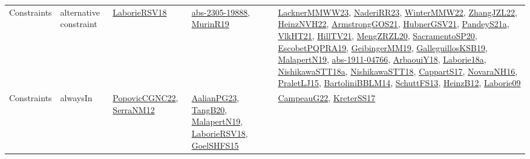 {\begin{longtable}{lp{3cm}>{\raggedright}p{6cm}>{\raggedright}p{6cm}p{8cm}}
Constraints & alternative constraint & \href{articles/LaborieRSV18.pdf}{LaborieRSV18}\cite{LaborieRSV18} & \href{articles/abs-2305-19888.pdf}{abs-2305-19888}\cite{abs-2305-19888}, \href{papers/MurinR19.pdf}{MurinR19}\cite{MurinR19} & \href{articles/LacknerMMWW23.pdf}{LacknerMMWW23}\cite{LacknerMMWW23}, \href{articles/NaderiRR23.pdf}{NaderiRR23}\cite{NaderiRR23}, \href{papers/WinterMMW22.pdf}{WinterMMW22}\cite{WinterMMW22}, \href{papers/ZhangJZL22.pdf}{ZhangJZL22}\cite{ZhangJZL22}, \href{articles/HeinzNVH22.pdf}{HeinzNVH22}\cite{HeinzNVH22}, \href{papers/ArmstrongGOS21.pdf}{ArmstrongGOS21}\cite{ArmstrongGOS21}, \href{articles/HubnerGSV21.pdf}{HubnerGSV21}\cite{HubnerGSV21}, \href{articles/PandeyS21a.pdf}{PandeyS21a}\cite{PandeyS21a}, \href{articles/VlkHT21.pdf}{VlkHT21}\cite{VlkHT21}, \href{papers/HillTV21.pdf}{HillTV21}\cite{HillTV21}, \href{articles/MengZRZL20.pdf}{MengZRZL20}\cite{MengZRZL20}, \href{articles/SacramentoSP20.pdf}{SacramentoSP20}\cite{SacramentoSP20}, \href{articles/EscobetPQPRA19.pdf}{EscobetPQPRA19}\cite{EscobetPQPRA19}, \href{papers/GeibingerMM19.pdf}{GeibingerMM19}\cite{GeibingerMM19}, \href{papers/GalleguillosKSB19.pdf}{GalleguillosKSB19}\cite{GalleguillosKSB19}, \href{papers/MalapertN19.pdf}{MalapertN19}\cite{MalapertN19}, \href{articles/abs-1911-04766.pdf}{abs-1911-04766}\cite{abs-1911-04766}, \href{papers/ArbaouiY18.pdf}{ArbaouiY18}\cite{ArbaouiY18}, \href{papers/Laborie18a.pdf}{Laborie18a}\cite{Laborie18a}, \href{papers/NishikawaSTT18a.pdf}{NishikawaSTT18a}\cite{NishikawaSTT18a}, \href{papers/NishikawaSTT18.pdf}{NishikawaSTT18}\cite{NishikawaSTT18}, \href{papers/CappartS17.pdf}{CappartS17}\cite{CappartS17}, \href{articles/NovaraNH16.pdf}{NovaraNH16}\cite{NovaraNH16}, \href{papers/PraletLJ15.pdf}{PraletLJ15}\cite{PraletLJ15}, \href{papers/BartoliniBBLM14.pdf}{BartoliniBBLM14}\cite{BartoliniBBLM14}, \href{papers/SchuttFS13.pdf}{SchuttFS13}\cite{SchuttFS13}, \href{papers/HeinzB12.pdf}{HeinzB12}\cite{HeinzB12}, \href{papers/Laborie09.pdf}{Laborie09}\cite{Laborie09}\\
Constraints & alwaysIn & \href{papers/PopovicCGNC22.pdf}{PopovicCGNC22}\cite{PopovicCGNC22}, \href{papers/SerraNM12.pdf}{SerraNM12}\cite{SerraNM12} & \href{papers/AalianPG23.pdf}{AalianPG23}\cite{AalianPG23}, \href{papers/TangB20.pdf}{TangB20}\cite{TangB20}, \href{papers/MalapertN19.pdf}{MalapertN19}\cite{MalapertN19}, \href{articles/LaborieRSV18.pdf}{LaborieRSV18}\cite{LaborieRSV18}, \href{articles/GoelSHFS15.pdf}{GoelSHFS15}\cite{GoelSHFS15} & \href{articles/CampeauG22.pdf}{CampeauG22}\cite{CampeauG22}, \href{articles/KreterSS17.pdf}{KreterSS17}\cite{KreterSS17}\\

\end{longtable}}
